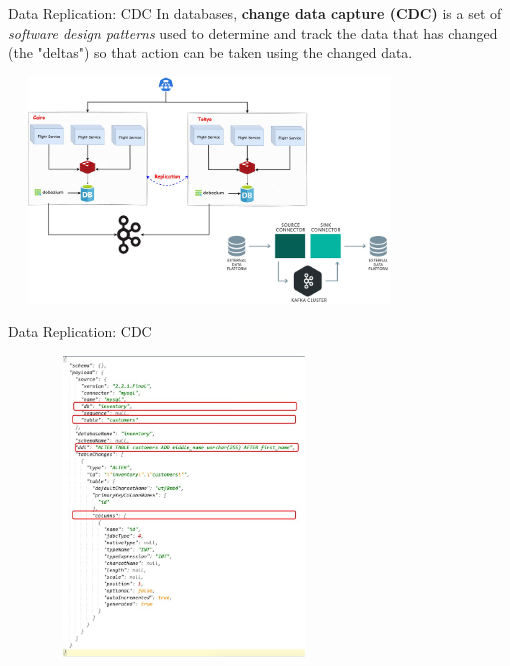 \documentclass{beamer}
\begin{document}
\begin{frame}{Data Replication: CDC}
\small In databases, \textbf{change data capture (CDC)} is a set of \textit{software design patterns} used to determine and track the data that has changed (the "deltas") so that action can be taken using the changed data.
        \begin{center}
   	 		\includegraphics[width=0.8\textwidth, height=60mm, scale=1]{img/kafka-connect1.jpg}
  		\end{center}
\end{frame}

\begin{frame}{Data Replication: CDC}
	\begin{center}
   	 		\includegraphics[width=0.7\textwidth, height=80mm, scale=2]{img/cdc-example.jpg}
  		\end{center}
\end{frame}
\end{document}
